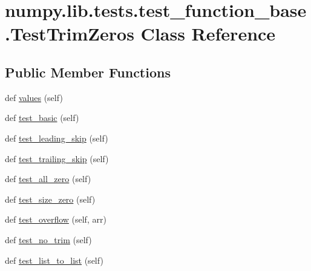 \hypertarget{classnumpy_1_1lib_1_1tests_1_1test__function__base_1_1TestTrimZeros}{}\section{numpy.\+lib.\+tests.\+test\+\_\+function\+\_\+base.\+Test\+Trim\+Zeros Class Reference}
\label{classnumpy_1_1lib_1_1tests_1_1test__function__base_1_1TestTrimZeros}
\subsection*{Public Member Functions}
\begin{DoxyCompactItemize}
\item 
def \hyperlink{classnumpy_1_1lib_1_1tests_1_1test__function__base_1_1TestTrimZeros_ac4ea63ec536142bf2f648ca52396320c}{values} (self)
\item 
def \hyperlink{classnumpy_1_1lib_1_1tests_1_1test__function__base_1_1TestTrimZeros_a01f27b060d583550456d14d874a8bbd6}{test\+\_\+basic} (self)
\item 
def \hyperlink{classnumpy_1_1lib_1_1tests_1_1test__function__base_1_1TestTrimZeros_a7c181258bf4024d6900a6b53478eeddf}{test\+\_\+leading\+\_\+skip} (self)
\item 
def \hyperlink{classnumpy_1_1lib_1_1tests_1_1test__function__base_1_1TestTrimZeros_a2e3c8752c2cda7ae49224d4f85e87d17}{test\+\_\+trailing\+\_\+skip} (self)
\item 
def \hyperlink{classnumpy_1_1lib_1_1tests_1_1test__function__base_1_1TestTrimZeros_a99ec344d27b8067807be41552c6a11ab}{test\+\_\+all\+\_\+zero} (self)
\item 
def \hyperlink{classnumpy_1_1lib_1_1tests_1_1test__function__base_1_1TestTrimZeros_a4fbca6a8f6dd96e7da73ee6016e7f743}{test\+\_\+size\+\_\+zero} (self)
\item 
def \hyperlink{classnumpy_1_1lib_1_1tests_1_1test__function__base_1_1TestTrimZeros_a05dad4f34fe4a8cb3b57a7df4cc5fe76}{test\+\_\+overflow} (self, arr)
\item 
def \hyperlink{classnumpy_1_1lib_1_1tests_1_1test__function__base_1_1TestTrimZeros_a54aa960eee8e085e6240fb62b87d89d1}{test\+\_\+no\+\_\+trim} (self)
\item 
def \hyperlink{classnumpy_1_1lib_1_1tests_1_1test__function__base_1_1TestTrimZeros_a93c6b07f39ad2d400911d2221fe9e161}{test\+\_\+list\+\_\+to\+\_\+list} (self)
\end{DoxyCompactItemize}
